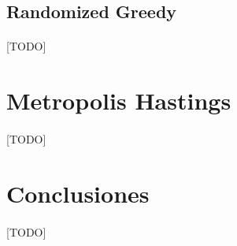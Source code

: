 \documentclass{subfiles}
\begin{document}
      \subsection{Randomized Greedy}
      \label{sec:heuristics_randomized_greedy}

        \paragraph{}
        [TODO]

    \section{Metropolis Hastings}
    \label{sec:heuristics_greedy}

      \paragraph{}
      [TODO]

    \section{Conclusiones}
    \label{sec:heuristics_conclusions}

      \paragraph{}
      [TODO]
\end{document}
